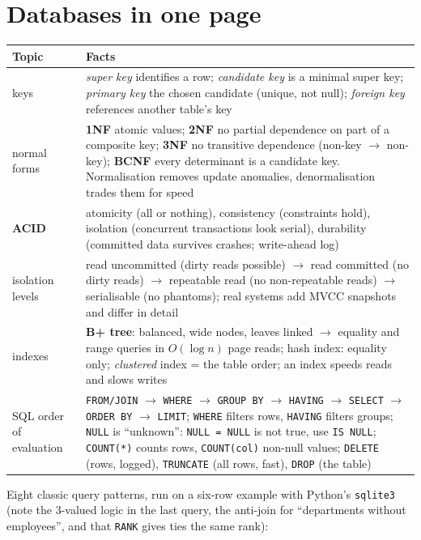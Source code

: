 \documentclass[10pt,a4paper,openany,oneside]{report}
\newcommand{\prio}[1]{\texorpdfstring{\ifcase#1\or{\color{gold}\ding{72}}\or{\color{gold}\ding{72}\ding{72}}\or{\color{gold}\ding{72}\ding{72}\ding{72}}\fi}{}}
\begin{document}
\section{Databases in one page \prio{1}}
\begin{center}\small
\begin{xltabular}{\textwidth}{@{}L{3.2cm}Y@{}}
\toprule
\textbf{Topic} & \textbf{Facts}\\
\midrule\endhead
keys & \emph{super key} identifies a row; \emph{candidate key} is a minimal super key; \emph{primary key} the chosen candidate (unique, not null); \emph{foreign key} references another table's key\\
normal forms & \textbf{1NF} atomic values; \textbf{2NF} no partial dependence on part of a composite key; \textbf{3NF} no transitive dependence (non-key $\to$ non-key); \textbf{BCNF} every determinant is a candidate key. Normalisation removes update anomalies, denormalisation trades them for speed\\
\textbf{ACID} & atomicity (all or nothing), consistency (constraints hold), isolation (concurrent transactions look serial), durability (committed data survives crashes; write-ahead log)\\
isolation levels & read uncommitted (dirty reads possible) $\to$ read committed (no dirty reads) $\to$ repeatable read (no non-repeatable reads) $\to$ serialisable (no phantoms); real systems add MVCC snapshots and differ in detail\\
indexes & \textbf{B+ tree}: balanced, wide nodes, leaves linked $\to$ equality and range queries in $O(\log n)$ page reads; hash index: equality only; \emph{clustered} index = the table order; an index speeds reads and slows writes\\
SQL order of evaluation & \texttt{FROM/JOIN} $\to$ \texttt{WHERE} $\to$ \texttt{GROUP BY} $\to$ \texttt{HAVING} $\to$ \texttt{SELECT} $\to$ \texttt{ORDER BY} $\to$ \texttt{LIMIT}; \texttt{WHERE} filters rows, \texttt{HAVING} filters groups; \texttt{NULL} is ``unknown'': \texttt{NULL = NULL} is not true, use \texttt{IS NULL}; \texttt{COUNT(*)} counts rows, \texttt{COUNT(col)} non-null values; \texttt{DELETE} (rows, logged), \texttt{TRUNCATE} (all rows, fast), \texttt{DROP} (the table)\\
\bottomrule
\end{xltabular}
\end{center}
Eight classic query patterns, run on a six-row example with Python's \texttt{sqlite3} (note the 3-valued logic in the last query, the anti-join for ``departments without employees'', and that \texttt{RANK} gives ties the same rank):
\end{document}
